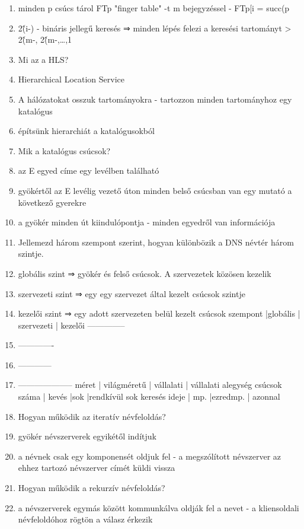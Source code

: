 \documentclass[twoside, a4paper, 12pt]{article}
\begin{document}
\begin{enumerate}
    \item minden p csúcs tárol FTp "finger table" -t m bejegyzéssel
        - FTp[i = succ(p\item2\^(i-)
        - bináris jellegű keresés ⇒ minden lépés felezi a keresési tartományt
        > 2\^(m-, 2\^(m-,\ldots,1
    \item  Mi az a HLS?
    \item Hierarchical Location Service
    \item A hálózatokat osszuk tartományokra
        - tartozzon minden tartományhoz egy katalógus
    \item építsünk hierarchiát a katalógusokból
    \item  Mik a katalógus csúcsok?
    \item az E egyed címe egy levélben található
    \item gyökértől az E levélig vezető úton minden belső csúcsban van egy mutató a következő gyerekre
    \item a gyökér minden út kiindulópontja
        - minden egyedről van információja
    \item  Jellemezd három szempont szerint, hogyan különbözik a DNS névtér három szintje.
    \item globális szint   ⇒ gyökér és felső csúcsok. A szervezetek közösen kezelik
    \item szervezeti szint ⇒ egy egy szervezet által kezelt csúcsok szintje
    \item kezelői szint    ⇒ egy adott szervezeten belül kezelt csúcsok
        szempont      |globális     | szervezeti | kezelői
        --------------\item-------------\item------------\item--------------------
        méret         | világméretű | vállalati  | vállalati alegység
        csúcsok száma | kevés       |sok         |rendkívül sok
        keresés ideje | mp.         |ezredmp.    | azonnal
    \item  Hogyan működik az iteratív névfeloldás?
    \item gyökér névszerverek egyikétől indítjuk
    \item a névnek csak egy komponensét oldjuk fel
        - a megszólított névszerver az ehhez tartozó névszerver címét küldi vissza
    \item  Hogyan működik a rekurzív névfeloldás?
    \item a névszerverek egymás között kommunkálva oldják fel a nevet
        - a kliensoldali névfeloldóhoz rögtön a válasz érkezik

\end{enumerate}
\end{document}
